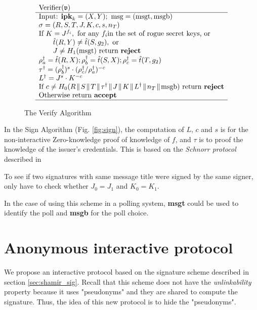 \begin{figure}[H]
$$\begin{array}{l}
\text{Verifier}(\mathfrak{v}) \\
\hline
\text{Input: \textbf{ipk}}_k = (X,Y); \ \text{msg} = (\text{msgt}, \text{msgb}) \\
\sigma = (R,S,T,J,K,c,s,n_T) \\
\text{If } K = J^{f_i}, \text{ for any } f_i \text{in the set of rogue secret keys, or} \\
\qquad \hat{t}(R,Y) \neq \hat{t}(S,g_2), \text{ or} \\
\qquad J \neq H_1(\text{msgt}) \text{ return \textbf{reject}} \\
\rho_a^\dagger = \hat{t}(R,X); \rho_b^\dagger = \hat{t}(S,X); \rho_c^\dagger = \hat{t}(T,g_2) \\
\tau^\dagger = (\rho_b^\dagger)^s \cdot (\rho_c^\dagger / \rho_a^\dagger)^{-c} \\
L^\dagger = J^s \cdot K^{-c} \\
\text{If } c \neq H_0 (R \con S \con T \con \tau^\dagger \con J \con K \con L^\dagger \con n_T \con \text{msgb}) \text{ return \textbf{reject}} \\
\text{Otherwise return \textbf{accept}} \\
\hline
\end{array}
$$
\caption{The Verify Algorithm}
\label{fig:verify}
\end{figure}

In the Sign Algorithm (Fig. \ref{fig:sign}), the computation of $L$, $c$ and $s$ is for the non-interactive Zero-knowledge proof of knowledge of $f$, and $\tau$ is to proof the knowledge of the issuer's credentials. This is based on the \textit{Schnorr protocol} described in \cite{Schnorr90}

To see if two signatures with same message title were signed by the same signer, only have to check whether $J_0 = J_1$ and $K_0 = K_1$.

In the case of using this scheme in a polling system, \textbf{msgt} could be used to identify the poll and \textbf{msgb} for the poll choice.

\section{Anonymous interactive protocol}

We propose an interactive protocol based on the signature scheme described in section \ref{sec:shamir_sig}. Recall that this scheme does not have the \textit{unlinkability} property because it uses "pseudonyms" and they are shared to compute the signature. Thus, the idea of this new protocol is to hide the "pseudonyms".

